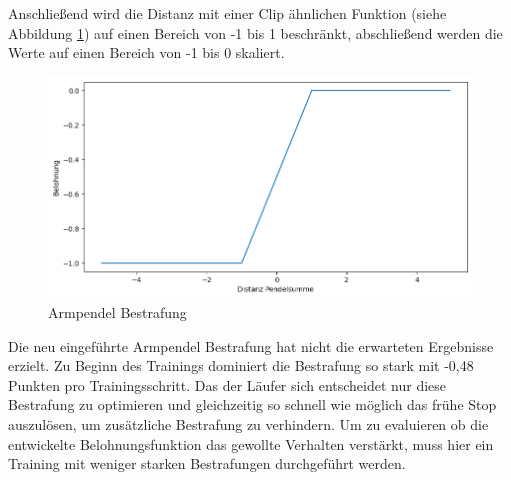 Anschließend wird die Distanz mit einer Clip ähnlichen Funktion (siehe Abbildung \ref{fig:plot_hand_pendel}) auf einen Bereich von -1 bis 1 beschränkt, abschließend werden die Werte auf einen Bereich von -1 bis 0 skaliert.

\begin{figure}[H]
  \centering  
  \includegraphics[width=\textwidth]{img/plot_hand_pendel}
  \caption{Armpendel Bestrafung}
  \label{fig:plot_hand_pendel}
\end{figure}

Die neu eingeführte Armpendel Bestrafung hat nicht die erwarteten Ergebnisse erzielt. Zu Beginn des Trainings dominiert die Bestrafung so stark mit -0,48 Punkten pro Trainingsschritt. Das der Läufer sich entscheidet nur diese Bestrafung zu optimieren und gleichzeitig so schnell wie möglich das frühe Stop auszulösen, um zusätzliche Bestrafung zu verhindern. Um zu evaluieren ob die entwickelte Belohnungsfunktion das gewollte Verhalten verstärkt, muss hier ein Training mit weniger starken Bestrafungen durchgeführt werden.

